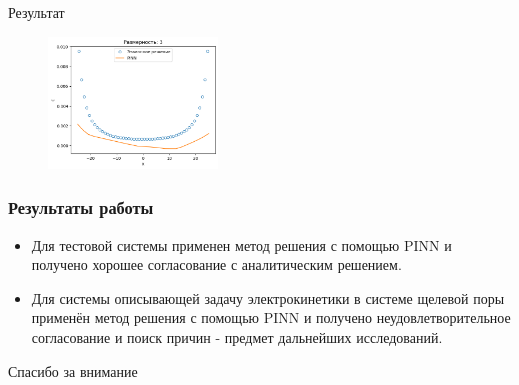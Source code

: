 \documentclass[t]{beamer}
\begin{document}
\begin{frame}
\begin{figure}[h]
\begin{subfigure}{0.35\textwidth}
            \end{subfigure}
        \end{figure}
        Результат
        \begin{figure}[H]
            \center
            \includegraphics[width=0.4\textwidth]{../plots/ek/3-dim tanh 20x4.png}
        \end{figure}
    \end{frame}
\begin{frame}
    \frametitle{Результаты работы}
        \begin{itemize}
            \item Для тестовой системы применен метод решения с помощью PINN и получено хорошее согласование с аналитическим решением.
            \item Для системы описывающей задачу электрокинетики в системе щелевой поры применён метод решения с помощью PINN и получено неудовлетворительное согласование и поиск причин - предмет дальнейших исследований.
        \end{itemize}
    \end{frame}
    \begin{frame}
        \begin{center}
            \Huge Спасибо за внимание
        \end{center}
    \end{frame}
    
\end{document}
